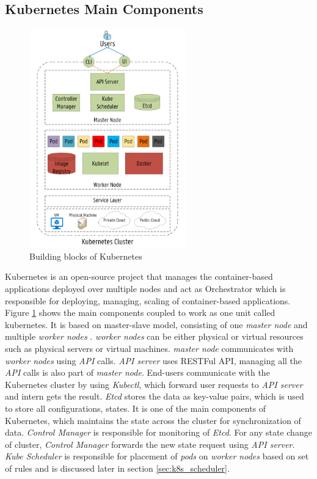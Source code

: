 \subsection{Kubernetes Main Components}
\label{sec:k8s_main_comp}
\begin{figure}
  \centering
  \includegraphics[width=68mm]{figures/mlcn-k8s-components.pdf}
  \caption{Building blocks of Kubernetes\cite{Santos2019}}
  \label{fig:k8s-comp}
\end{figure}
Kubernetes is an open-source project that manages the container-based applications deployed over multiple nodes and act as Orchestrator which is responsible for deploying, managing, scaling of container-based applications\cite{k8s-git}. Figure \ref{fig:k8s-comp} shows the main components coupled to work as one unit called kubernetes. It is based on master-slave model, consisting of one \emph{master node} and multiple \emph{worker nodes} \cite{Santos2019}. \emph{worker nodes} can be either physical or virtual resources such as physical servers or virtual machines. \emph{master node} communicates with \emph{worker nodes} using \emph{API} calls\cite{Santos2019}. \emph{API server} uses RESTFul API, managing all the \emph{API} calls is also part of \emph{master node}. End-users communicate with the Kubernetes cluster by using \emph{Kubectl}, which forward user requests to \emph{API server} and intern gets the result. \emph{Etcd} stores the data as key-value pairs, which is used to store all configurations, states. It is one of the main components of Kubernetes, which maintains the state across the cluster for synchronization of data\cite{Santos2019}. \emph{Control Manager} is responsible for monitoring of \emph{Etcd}. For any state change of cluster, \emph{Control Manager} forwards the new state request using \emph{API server}\cite{Santos2019}. \emph{Kube Scheduler} is responsible for placement of \emph{pods} on \emph{worker nodes} based on set of rules and is discussed later in section \ref{sec:k8s_scheduler}. \par
